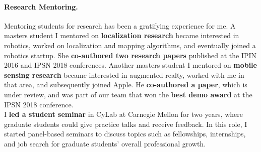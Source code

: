 \documentclass[10pt]{article}
\begin{document}


\paragraph{Research Mentoring. }
Mentoring students for research has been a gratifying experience for me. 
 A masters student I mentored on \textbf{localization research} became interested in robotics, worked on localization and mapping algorithms,  and eventually joined a robotics startup. She \textbf{co-authored two research papers} published at the IPIN 2016 and IPSN 2018 conferences.
Another masters student I mentored on \textbf{mobile sensing research} became interested in augmented realty, worked with me in that area, and subsequently joined Apple. He \textbf{co-authored a paper}, which is under review, and was part of our team that won the \textbf{best demo award} at the IPSN 2018 conference.\\ %

I \textbf{led a student seminar} in CyLab at Carnegie Mellon for two years, where graduate students could give practice talks and receive feedback. In this role, I started panel-based seminars to discuss topics such as fellowships, internships, and job search for graduate students' overall professional growth. 
\end{document}
